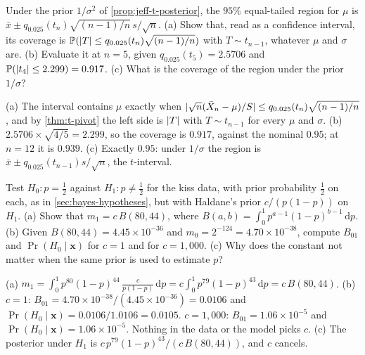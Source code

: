 \begin{exercise}
\label{ex:jeff-joint}
Under the prior $1/\sigma^2$ of \cref{prop:jeff-t-posterior}, the $95\%$ equal-tailed region for $\mu$ is $\bar{x} \pm q_{0.025}(t_n)\sqrt{(n-1)/n}\,s/\sqrt{n}$. (a) Show that, read as a confidence interval, its coverage is $\mathbb{P}(\lvert T\rvert \leq q_{0.025}(t_n)\sqrt{(n-1)/n})$ with $T \sim t_{n-1}$, whatever $\mu$ and $\sigma$ are. (b) Evaluate it at $n = 5$, given $q_{0.025}(t_5) = 2.5706$ and $\mathbb{P}(\lvert t_4\rvert \leq 2.299) = 0.917$. (c) What is the coverage of the region under the prior $1/\sigma$?
\end{exercise}
\begin{solution}
(a) The interval contains $\mu$ exactly when $\lvert\sqrt{n}(\bar{X}_n - \mu)/S\rvert \leq q_{0.025}(t_n)\sqrt{(n-1)/n}$, and by \cref{thm:t-pivot} the left side is $\lvert T\rvert$ with $T \sim t_{n-1}$ for every $\mu$ and $\sigma$. (b) $2.5706 \times \sqrt{4/5} = 2.299$, so the coverage is $0.917$, against the nominal $0.95$; at $n = 12$ it is $0.939$. (c) Exactly $0.95$: under $1/\sigma$ the region is $\bar{x} \pm q_{0.025}(t_{n-1})s/\sqrt{n}$, the $t$-interval.
\end{solution}

\begin{exercise}
\label{ex:jeff-bayes-factor}
Test $H_0: p = \frac12$ against $H_1: p \neq \frac12$ for the kiss data, with prior probability $\frac12$ on each, as in \cref{sec:bayes-hypotheses}, but with Haldane's prior $c/(p(1-p))$ on $H_1$. (a) Show that $m_1 = c\,B(80, 44)$, where $B(a, b) = \int_0^1 p^{a-1}(1-p)^{b-1}\,\mathrm{d}p$. (b) Given $B(80, 44) = 4.45 \times 10^{-36}$ and $m_0 = 2^{-124} = 4.70 \times 10^{-38}$, compute $B_{01}$ and $\Pr(H_0 \mid \mathbf{x})$ for $c = 1$ and for $c = 1{,}000$. (c) Why does the constant not matter when the same prior is used to estimate $p$?
\end{exercise}
\begin{solution}
(a) $m_1 = \int_0^1 p^{80}(1-p)^{44}\,\frac{c}{p(1-p)}\,\mathrm{d}p = c\int_0^1 p^{79}(1-p)^{43}\,\mathrm{d}p = c\,B(80, 44)$. (b) $c = 1$: $B_{01} = 4.70 \times 10^{-38}/(4.45 \times 10^{-36}) = 0.0106$ and $\Pr(H_0 \mid \mathbf{x}) = 0.0106/1.0106 = 0.0105$. $c = 1{,}000$: $B_{01} = 1.06 \times 10^{-5}$ and $\Pr(H_0 \mid \mathbf{x}) = 1.06 \times 10^{-5}$. Nothing in the data or the model picks $c$. (c) The posterior under $H_1$ is $c\,p^{79}(1-p)^{43}/(c\,B(80, 44))$, and $c$ cancels.
\end{solution}

